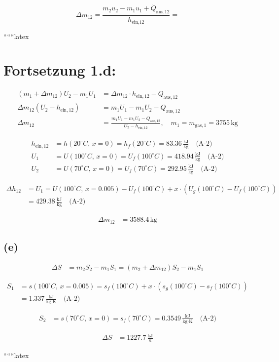 \[
\Delta m_{12} = \frac{m_2 u_2 - m_1 u_1 + \dot{Q}_{\text{aus,12}}}{h_{\text{ein,12}}} =
\]

``````latex


\section*{Fortsetzung 1.d:}

\begin{align*}
(m_1 + \Delta m_{12}) U_2 - m_1 U_1 &= \Delta m_{12} \cdot h_{\text{ein},12} - Q_{\text{aus},12} \\
\Delta m_{12} (U_2 - h_{\text{ein},12}) &= m_1 U_1 - m_1 U_2 - Q_{\text{aus},12} \\
\Delta m_{12} &= \frac{m_1 U_1 - m_1 U_2 - Q_{\text{aus},12}}{U_2 - h_{\text{ein},12}}, \quad m_1 = m_{\text{gas},1} = 3755 \, \text{kg}
\end{align*}

\begin{align*}
h_{\text{ein},12} &= h(20^\circ C, \, x=0) = h_f(20^\circ C) = 83.36 \, \frac{\text{kJ}}{\text{kg}} \quad \text{(A-2)} \\
U_1 &= U(100^\circ C, \, x=0) = U_f(100^\circ C) = 418.94 \, \frac{\text{kJ}}{\text{kg}} \quad \text{(A-2)} \\
U_2 &= U(70^\circ C, \, x=0) = U_f(70^\circ C) = 292.95 \, \frac{\text{kJ}}{\text{kg}} \quad \text{(A-2)}
\end{align*}

\begin{align*}
\Delta h_{12} &= U_1 = U(100^\circ C, \, x=0.005) - U_f(100^\circ C) + x \cdot (U_g(100^\circ C) - U_f(100^\circ C)) \\
&= 429.38 \, \frac{\text{kJ}}{\text{kg}} \quad \text{(A-2)}
\end{align*}

\begin{align*}
\Delta m_{12} &= 3588.4 \, \text{kg}
\end{align*}

\subsection*{(e)}

\begin{align*}
\Delta S &= m_2 S_2 - m_1 S_1 = (m_2 + \Delta m_{12}) S_2 - m_1 S_1
\end{align*}

\begin{align*}
S_1 &= s(100^\circ C, \, x=0.005) = s_f(100^\circ C) + x \cdot (s_g(100^\circ C) - s_f(100^\circ C)) \\
&= 1.337 \, \frac{\text{kJ}}{\text{kg} \cdot \text{K}} \quad \text{(A-2)}
\end{align*}

\begin{align*}
S_2 &= s(70^\circ C, \, x=0) = s_f(70^\circ C) = 0.3549 \, \frac{\text{kJ}}{\text{kg} \cdot \text{K}} \quad \text{(A-2)}
\end{align*}

\begin{align*}
\Delta S &= 1227.7 \, \frac{\text{kJ}}{\text{K}}
\end{align*}

``````latex



